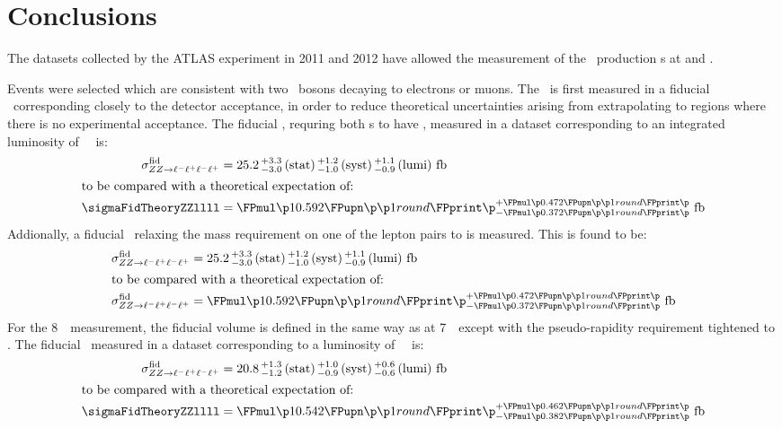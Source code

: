 \graphicspath{{Chapters/Conclusions/Figures/}}
\chapter{Conclusions}
\label{chap:Conclusions}
The datasets collected by the ATLAS experiment in 2011 and 2012 have allowed the
measurement of the \ZZ\ production \cx s at  and .

Events were selected which are consistent with two \Z\ bosons decaying to electrons or muons. The \cx\ is
first measured in a fiducial \phasespace\ corresponding closely to the detector
acceptance, in order to reduce theoretical uncertainties arising from
extrapolating to regions where there is no experimental acceptance.
The fiducial \cx,  requring both \leppair s to have \sstooos, measured in a
dataset corresponding to an integrated  luminosity of
\LumiPassGRLTwentyEleven~\ifb\ is:
\begin{align}
\sigmaFidZZllll &= \ZZSevenTeVFiducialCrossSectionZZLLLL \\
\intertext{to be compared with a theoretical expectation of:}
\sigmaFidTheoryZZllll &= \ZZSevenTeVTheoryFiducialCrossSectionZZLLLL
\end{align}
Addionally, a fiducial \cx\ relaxing the mass requirement on one of the lepton pairs
to \mllgtt is measured. This is found to be:
\begin{align}
\sigmaFidZZllll &= \ZZSevenTeVFiducialCrossSectionZZLLLL \\
\intertext{to be compared with a theoretical expectation of:}
\sigmaFidZZllll &= \ZZSevenTeVTheoryFiducialCrossSectionZZLLLL
\end{align}
For the 8~\tev\ measurement, the fiducial volume is defined in the same way as
at 7~\tev\, except with the pseudo-rapidity requirement tightened to . The fiducial \cx\
measured in a dataset corresponding to a luminosity of
\LumiPassGRLTwentyTwelve~\ifb\ is:
\begin{align}
\sigmaFidZZllll &= \ZZEightTeVFiducialCrossSectionZZLLLL \\
\intertext{to be compared with a theoretical expectation of:}
\sigmaFidTheoryZZllll &= \ZZEightTeVTheoryFiducialCrossSectionZZLLLL
\end{align}


